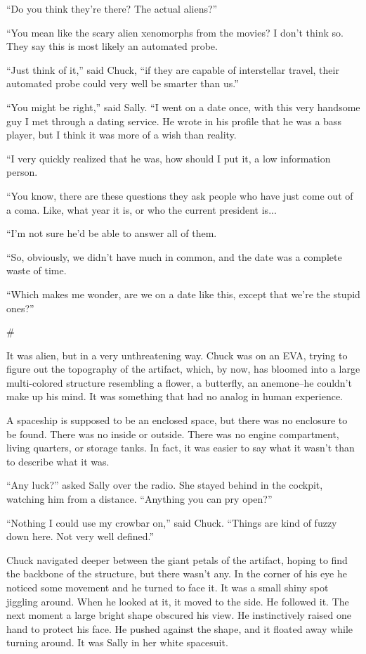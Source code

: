 \documentclass[12pt]{book}
\newcommand{\sbreak}{
\begin{center}
  \#
\end{center}
}
\begin{document}
``Do you think they're there? The actual aliens?''

``You mean like the scary alien xenomorphs from the movies? I don't think so. They say this is most likely an automated probe.

``Just think of it,'' said Chuck, ``if they are capable of interstellar travel, their automated probe could very well be smarter than us.''

``You might be right,'' said Sally. ``I went on a date once, with this very handsome guy I met through a dating service. He wrote in his profile that he was a bass player, but I think it was more of a wish than reality. 

``I very quickly realized that he was, how should I put it, a low information person. 

``You know, there are these questions they ask people who have just come out of a coma. Like, what year it is, or who the current president is...

``I'm not sure he'd be able to answer all of them.

``So, obviously, we didn't have much in common, and the date was a complete waste of time.

``Which makes me wonder, are we on a date like this, except that we're the stupid ones?''

\sbreak

It was alien, but in a very unthreatening way. Chuck was on an EVA, trying to figure out the topography of the artifact, which, by now, has bloomed into a large multi-colored structure resembling a flower, a butterfly, an anemone--he couldn't make up his mind. It was something that had no analog in human experience.

A spaceship is supposed to be an enclosed space, but there was no enclosure to be found. There was no inside or outside. There was no engine compartment, living quarters, or storage tanks. In fact, it was easier to say what it wasn't than to describe what it was.

``Any luck?'' asked Sally over the radio. She stayed behind in the cockpit, watching him from a distance. ``Anything you can pry open?''

``Nothing I could use my crowbar on,'' said Chuck. ``Things are kind of fuzzy down here. Not very well defined.''

Chuck navigated deeper between the giant petals of the artifact, hoping to find the backbone of the structure, but there wasn't any. In the corner of his eye he noticed some movement and he turned to face it. It was a small shiny spot jiggling around. When he looked at it, it moved to the side. He followed it. The next moment a large bright shape obscured his view. He instinctively raised one hand to protect his face. He pushed against the shape, and it floated away while turning around. It was Sally in her white spacesuit.
\end{document}
